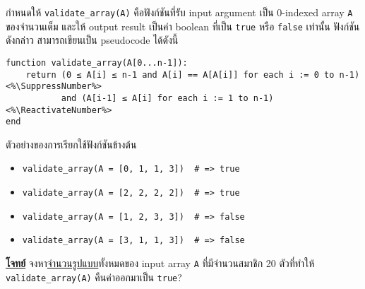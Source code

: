 \question{}

กำหนดให้ \lstinline{validate_array(A)} คือฟังก์ชันที่รับ input argument
เป็น 0-indexed array \lstinline{A} ของจำนวนเต็ม\;
และให้ output result เป็นค่า boolean ที่เป็น \lstinline{true} หรือ \lstinline{false} เท่านั้น\;
ฟังก์ชันดังกล่าว สามารถเขียนเป็น pseudocode ได้ดังนี้
\begin{fullwidth}
\vspace*{-\baselineskip}    
\begin{lstlisting}
function validate_array(A[0...n-1]):
    return (0 ≤ A[i] ≤ n-1 and A[i] == A[A[i]] for each i := 0 to n-1)  <%\SuppressNumber%>
           and (A[i-1] ≤ A[i] for each i := 1 to n-1)  <%\ReactivateNumber%>
end
\end{lstlisting}
\end{fullwidth}

\smallskip\noindent
ตัวอย่างของการเรียกใช้ฟังก์ชันข้างต้น
\begin{itemize}[itemsep=0pt]
\item \lstinline|validate_array(A = [0, 1, 1, 3])  # => true|
\item \lstinline|validate_array(A = [2, 2, 2, 2])  # => true|
\item \lstinline|validate_array(A = [1, 2, 3, 3])  # => false|
\item \lstinline|validate_array(A = [3, 1, 1, 3])  # => false|
\end{itemize}

\textbf{\uline{โจทย์}}\; จงหา\uline{จำนวนรูปแบบ}ทั้งหมดของ input array \lstinline|A| 
ที่มีจำนวนสมาชิก 20 ตัวที่ทำให้ \lstinline|validate_array(A)| คืนค่าออกมาเป็น \lstinline|true|?
